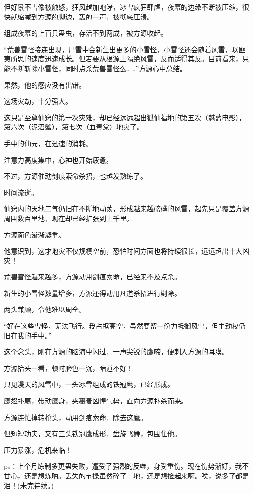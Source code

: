 \begin{this_body}
但好景不雪像被触怒，狂风越加咆哮，冰雪疯狂肆虐，夜幕的边缘不断被压缩，很快就缩减到方源的脚边，轰的一声，被彻底压溃。

组成夜幕的上百只蛊虫，存活不到两成，被方源收起。

“荒兽雪怪接连出现，尸雪中会新生出更多的小雪怪，小雪怪还会随着风雪，以匪夷所思的速度迅速成长。但若要从根源上隔绝风雪，反而适得其反。目前看来，只能不断斩除小雪怪，同时点杀荒兽雪怪么……”方源心中总结。

果然，他的感应没有出错。

这场灾劫，十分强大。

这只是至尊仙窍的第一次灾难，却已经远远超出狐仙福地的第五次（魅蓝电影），第六次（泥沼蟹），第七次（血毒棠）地灾了。

手中的仙元，在迅速的消耗。

注意力高度集中，心神也开始疲惫。

不过，方源催动剑痕索命杀招，也越发熟练了。

时间流逝。

仙窍内的天地二气仍旧在不断地动荡，形成越来越磅礴的风雪，起先只是覆盖方源周围数百里地，现在却已经扩张到上千里。

方源面色渐渐凝重。

他意识到，这才地灾不仅规模空前，恐怕时间方面也将持续很长，远远超出十大凶灾！

荒兽雪怪越来越多，方源动用剑痕索命，已经来不及点杀。

新生的小雪怪数量增多，方源还得动用凡道杀招进行剿除。

两头兼顾，令他难以周全。

“好在这些雪怪，无法飞行。我占据高空，虽然要留一份力抵御风雪，但主动权仍旧在我的手中。”

这个念头，刚在方源的脑海中闪过，一声尖锐的鹰啼，便刺入方源的耳膜。

方源抬头一看，顿时脸色一沉，暗道不好！

只见漫天的风雪中，一头冰雪组成的铁冠鹰，已经形成。

鹰翅扑扇，带动鹰身，夹裹着凶悍气势，直向方源扑杀而来。

方源连忙掉转枪头，动用剑痕索命，除去这鹰。

但短短功夫，又有三头铁冠鹰成形，盘旋飞舞，包围住他。

压力暴涨，危机来临！

ps：上个月炼制多更蛊失败，遭受了强烈的反噬，身受重伤。现在伤势渐好，我不甘心，还是想炼呐。丢失的节操虽然碎了一地，还是想捡起来啊。唉，说多了都是泪！(未完待续。)

\end{this_body}


